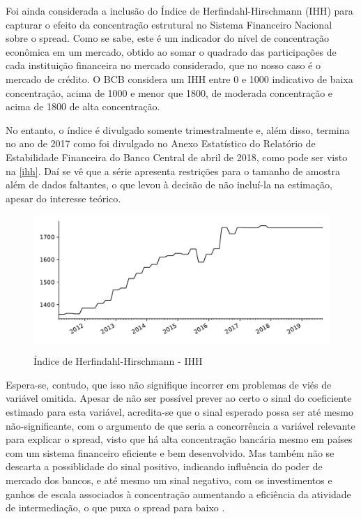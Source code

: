 \documentclass[a4paper,
               article,
               12pt,
               openany,
               oneside,
               english,
               brazil]{abntex2}
\numberwithin{equation}{section}
\begin{document}
    Foi ainda considerada a inclusão do Índice de Herfindahl-Hirschmann (IHH) para capturar o efeito da concentração estrutural no Sistema Financeiro Nacional sobre o spread. Como se sabe, este é um indicador do nível de concentração econômica em um mercado, obtido ao somar o quadrado das participações de cada instituição financeira no mercado considerado, que no nosso caso é o mercado de crédito. O BCB considera um IHH entre 0 e 1000 indicativo de baixa concentração, acima de 1000 e menor que 1800, de moderada concentração e acima de 1800 de alta concentração.
    
    No entanto, o índice é divulgado somente trimestralmente e, além disso, termina no ano de 2017 como foi divulgado no Anexo Estatístico do Relatório de Estabilidade Financeira do Banco Central de abril de 2018, como pode ser visto na \autoref{ihh}. Daí se vê que a série apresenta restrições para o tamanho de amostra além de dados faltantes, o que levou à decisão de não incluí-la na estimação, apesar do interesse teórico.

    \begin{figure}[h]
        \centering
        \caption{Índice de Herfindahl-Hirschmann - IHH}
        \includegraphics[width = \textwidth, scale=0.75]{ihh.pdf}
        \label{ihh}
    \end{figure}

    Espera-se, contudo, que isso não signifique incorrer em problemas de viés de variável omitida. Apesar de não ser possível prever ao certo o sinal do coeficiente estimado para esta variável, acredita-se que o sinal esperado possa ser até mesmo não-significante, com o argumento de que seria a concorrência a variável relevante para explicar o spread, visto que há alta concentração bancária mesmo em países com um sistema financeiro eficiente e bem desenvolvido. Mas também não se descarta a possiblidade do sinal positivo, indicando influência do poder de mercado dos bancos, e até mesmo um sinal negativo, com os investimentos e ganhos de escala associados à concentração aumentando a eficiência da atividade de intermediação, o que puxa o spread para baixo \cite{reb2017}. 
\end{document}
